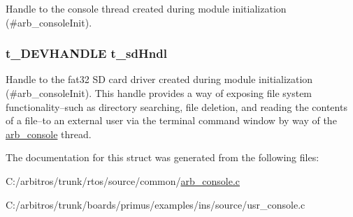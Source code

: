 Handle to the console thread created during module initialization (\#arb\-\_\-console\-Init). \hypertarget{structt__console_object_aaabb9b990f986cd929e22cd0da9586f1}{
\subsubsection[{t\-\_\-sd\-Hndl}]{\setlength{\rightskip}{0pt plus 5cm}t\-\_\-\-D\-E\-V\-H\-A\-N\-D\-L\-E t\-\_\-sd\-Hndl}}\label{structt__console_object_aaabb9b990f986cd929e22cd0da9586f1}
Handle to the fat32 S\-D card driver created during module initialization (\#arb\-\_\-console\-Init). This handle provides a way of exposing file system functionality--such as directory searching, file deletion, and reading the contents of a file--to an external user via the terminal command window by way of the \hyperlink{arb__console_8c_a53daff761c655e05e651b375d95d6309}{arb\-\_\-console} thread. 

The documentation for this struct was generated from the following files\-:\begin{DoxyCompactItemize}
\item 
C\-:/arbitros/trunk/rtos/source/common/\hyperlink{arb__console_8c}{arb\-\_\-console.\-c}\item 
C\-:/arbitros/trunk/boards/primus/examples/ins/source/usr\-\_\-console.\-c\end{DoxyCompactItemize}
